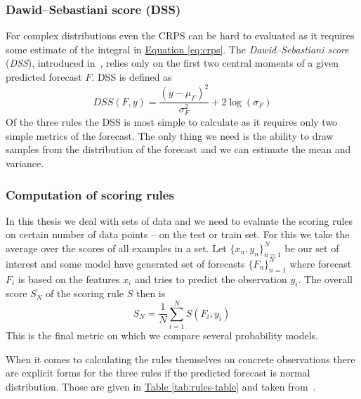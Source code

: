 \documentclass[12pt,a4paper,twoside]{scrartcl}
\numberwithin{equation}{section}
\newcommand{\reftab}[1]{\hyperref[#1]{Table \ref*{#1}}}
\renewcommand*{\refeq}[1]{\hyperref[#1]{Equation \ref*{#1}}}
\begin{document}
\subsubsection{Dawid–Sebastiani score (DSS)}\label{sec:dss}
For complex distributions even the CRPS can be hard to evaluated as it requires some estimate of the integral in \refeq{eq:crps}. The \emph{Dawid–Sebastiani score} (\emph{DSS}), introduced in~\cite{dawid1999}, relies only on the first two central moments of a given predicted forecast \(F\). DSS is defined as
\begin{equation}
  DSS(F,y) =  \frac{(y-\mu_F)^2}{\sigma_F^2}+2\log(\sigma_F)
\end{equation}
Of the three rules the DSS is most simple to calculate as it requires only two simple metrics of the forecast. The only thing we need is the ability to draw samples from the distribution of the forecast and we can estimate the mean and variance.
\subsubsection{Computation of scoring rules}\label{sec:eval-rules}
In this thesis we deal with sets of data and we need to evaluate the scoring rules on certain number of data points -- on the test or train set. For this we take the average over the scores of all examples in a set. Let \(\{x_n, y_n\}_{n=1}^N\) be our set of interest and some model have generated set of forecasts \(\{F_n\}_{n=1}^N\) where forecast \(F_i\) is based on the features \(x_i\) and tries to predict the observation \(y_i\). The overall score \(\bar{S_N}\) of the scoring rule \(S\) then is
\begin{equation}
  S_N = \frac{1}{N}\sum_{i=1}^N S(F_i, y_i) \,
\end{equation}
This is the final metric on which we compare several probability models.

When it comes to calculating the rules themselves on concrete observations there are explicit forms for the three rules if the predicted forecast is normal distribution. Those are given in \reftab{tab:rules-table} and taken from~\cite{gneiting2014}.
\end{document}
